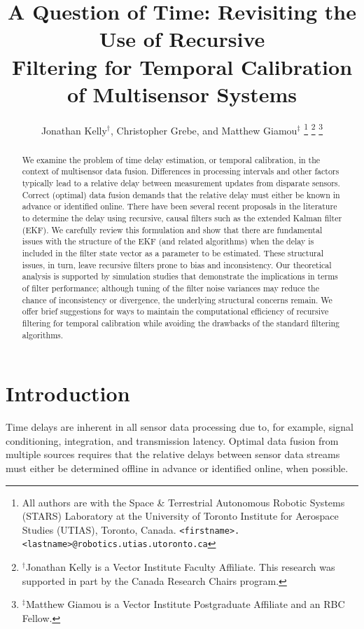 \documentclass[letterpaper,10pt,conference]{ieeeconf}
\title{\Large\bf A Question of Time: Revisiting the Use of Recursive\\ Filtering for Temporal Calibration of Multisensor Systems}
\author{Jonathan Kelly$^{\dagger}$, Christopher Grebe, and Matthew Giamou$^{\ddagger}$ 
\thanks{All authors are with the Space \& Terrestrial Autonomous Robotic Systems (STARS) Laboratory at the University of Toronto Institute for Aerospace Studies (UTIAS), Toronto, Canada. {\tt\footnotesize <firstname>.<lastname>@robotics.utias.utoronto.ca}}
\thanks{$^\dagger$Jonathan Kelly is a Vector Institute Faculty Affiliate. This research was supported in part by the Canada Research Chairs program.}
\thanks{$^{\ddagger}$Matthew Giamou is a Vector Institute Postgraduate Affiliate and an RBC Fellow.}}
\theoremstyle{definition}
\begin{document}
\maketitle

\begin{abstract}
We examine the problem of time delay estimation, or temporal calibration, in the context of multisensor data fusion.
%
Differences in processing intervals and other factors typically lead to a relative delay between measurement updates from disparate sensors.
%
Correct (optimal) data fusion demands that the relative delay must either be known in advance or identified online.
%
There have been several recent proposals in the literature to determine the delay using recursive, causal filters such as the extended Kalman filter (EKF). 
%
We carefully review this formulation and show that there are fundamental issues with the structure of the EKF (and related algorithms) when the delay is included in the filter state vector as a parameter to be estimated.
%
These structural issues, in turn, leave recursive filters prone to bias and inconsistency.
%
Our theoretical analysis is supported by simulation studies that demonstrate the implications in terms of filter performance; although tuning of the filter noise variances may reduce the chance of inconsistency or divergence, the underlying structural concerns remain.
%
We offer brief suggestions for ways to maintain the computational efficiency of recursive filtering for temporal calibration while avoiding the drawbacks of the standard filtering algorithms.
\end{abstract}

\section{Introduction}
\label{sec:intro}

Time delays are inherent in all sensor data processing due to, for example, signal conditioning, integration, and transmission latency.
%
Optimal data fusion from multiple sources requires that the relative delays between sensor data streams must either be determined offline in advance or identified online, when possible.
\end{document}
